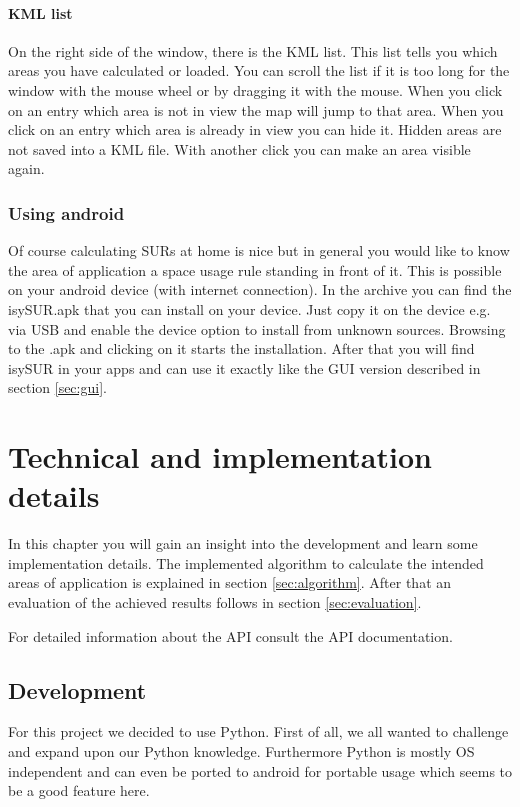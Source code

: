 \documentclass[11pt,fleqn]{book} %
\begin{document}
\subsubsection{KML list}
On the right side of the window, there is the KML list. This list tells you which areas you have calculated or loaded. You can scroll the list if it is too long for the window with the mouse wheel or by dragging it with the mouse. When you click on an entry which area is not in view the map will jump to that area. When you click on an entry which area is already in view you can hide it. Hidden areas are not saved into a KML file. With another click you can make an area visible again.

\subsection{Using android}\label{sec:android}
Of course calculating SURs at home is nice but in general you would like to know the area of application a space usage rule standing in front of it. This is possible on your android device (with internet connection). In the archive you can find the isySUR.apk that you can install on your device. Just copy it on the device e.g. via USB and enable the device option to install from unknown sources. Browsing to the .apk and clicking on it starts the installation. After that you will find isySUR in your apps and can use it exactly like the GUI version described in section \ref{sec:gui}.


\chapter{Technical and implementation details}
In this chapter you will gain an insight into the development and learn some implementation details. The implemented algorithm to calculate the intended areas of application is explained in section \ref{sec:algorithm}. After that an evaluation of the achieved results follows in section \ref{sec:evaluation}.

For detailed information about the API consult the API documentation.

\section{Development}
For this project we decided to use Python. First of all, we all wanted to challenge and expand upon our Python knowledge. Furthermore Python is mostly OS independent and can even be ported to android for portable usage which seems to be a good feature here.
\end{document}
